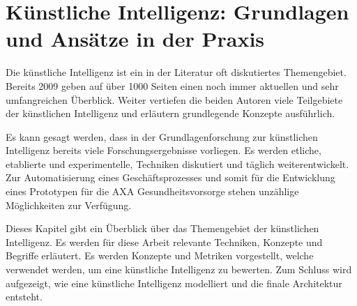 
\section{Künstliche Intelligenz: Grundlagen und Ansätze in der Praxis}
\label{chap:ai}


Die künstliche Intelligenz ist ein in der Literatur oft diskutiertes Themengebiet. Bereits 2009 geben \textcite{Russell2009} auf über 1000 Seiten einen noch immer aktuellen und sehr umfangreichen Überblick. Weiter vertiefen die beiden Autoren viele Teilgebiete der künstlichen Intelligenz und erläutern grundlegende Konzepte ausführlich.


Es kann gesagt werden, dass in der Grundlagenforschung zur künstlichen Intelligenz bereits viele Forschungsergebnisse vorliegen. Es werden etliche, etablierte und experimentelle, Techniken diskutiert und täglich weiterentwickelt. Zur Automatisierung eines Geschäftsprozesses und somit für die Entwicklung eines Prototypen für die AXA Gesundheitsvorsorge stehen unzählige Möglichkeiten zur Verfügung.

Dieses Kapitel gibt ein Überblick über das Themengebiet der künstlichen Intelligenz. Es werden für diese Arbeit relevante Techniken, Konzepte und Begriffe erläutert. Es werden Konzepte und Metriken vorgestellt, welche verwendet werden, um eine künstliche Intelligenz zu bewerten. Zum Schluss wird aufgezeigt, wie eine künstliche Intelligenz modelliert und die finale Architektur entsteht.

